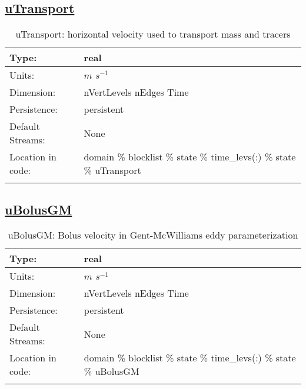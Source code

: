\subsection[uTransport]{\hyperref[sec:var_tab_state]{uTransport}}
\label{subsec:var_sec_state_uTransport}
\begin{center}
\begin{longtable}{| p{2.0in} | p{4.0in} |}
        \hline 
        Type: & real \\
        \hline 
        Units: & $m$ $s^{-1}$ \\
        \hline 
        Dimension: & nVertLevels nEdges Time \\
        \hline 
        Persistence: & persistent \\
        \hline 
		 Default Streams: & None \\
        \hline 
		 Location in code: & domain \% blocklist \% state \% time\_levs(:) \% state \% uTransport \\
		 \hline 
    \caption{uTransport: horizontal velocity used to transport mass and tracers}
\end{longtable}
\end{center}
\subsection[uBolusGM]{\hyperref[sec:var_tab_state]{uBolusGM}}
\label{subsec:var_sec_state_uBolusGM}
\begin{center}
\begin{longtable}{| p{2.0in} | p{4.0in} |}
        \hline 
        Type: & real \\
        \hline 
        Units: & $m$ $s^{-1}$ \\
        \hline 
        Dimension: & nVertLevels nEdges Time \\
        \hline 
        Persistence: & persistent \\
        \hline 
		 Default Streams: & None \\
        \hline 
		 Location in code: & domain \% blocklist \% state \% time\_levs(:) \% state \% uBolusGM \\
		 \hline 
    \caption{uBolusGM: Bolus velocity in Gent-McWilliams eddy parameterization}
\end{longtable}
\end{center}
